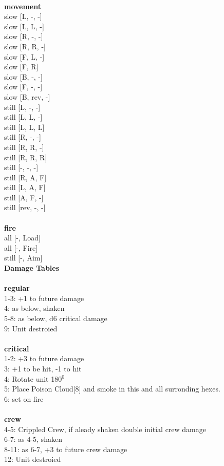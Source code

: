 \ \\ {\bf movement } \\
slow [L, -, -] \\
slow [L, L, -] \\
slow [R, -, -] \\
slow [R, R, -] \\
slow [F, L, -] \\
slow [F, R] \\
slow [B, -, -] \\
slow [F, -, -] \\
slow [B, rev, -] \\
still [L, -, -] \\
still [L, L, -] \\
still [L, L, L] \\
still [R, -, -] \\
still [R, R, -] \\
still [R, R, R] \\
still [-, -, -] \\
still [R, A, F] \\
still [L, A, F] \\
still [A, F, -] \\
still [rev, -, -] \\
\ \\ {\bf fire } \\
all [-, Load] \\
all [-, Fire] \\
still [-, Aim] \\


{\bf Damage Tables} \\
\ \\ {\bf regular } \\
1-3: +1 to future damage \\
4: as below, shaken \\
5-8: as below, d6 critical damage \\
9: Unit destroied \\
\ \\ {\bf critical } \\
1-2: +3 to future damage \\
3: +1 to be hit, -1 to hit \\
4: Rotate unit 180$^0$ \\
5: Place Poison Cloud[8] and smoke in this and all surronding hexes. \\
6: set on fire \\
\ \\ {\bf crew } \\
4-5: Crippled Crew, if aleady shaken double initial crew damage \\
6-7: as 4-5, shaken \\
8-11: as 6-7, +3 to future crew damage \\
12: Unit destroied \\











